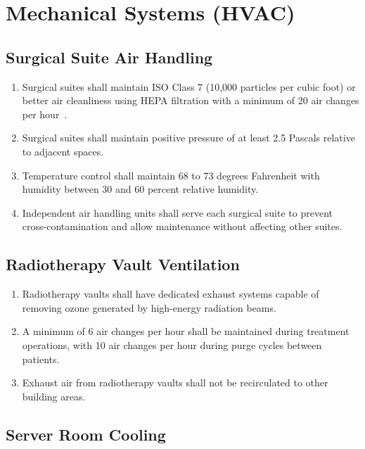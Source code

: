\documentclass[11pt,letterpaper]{article}
\begin{document}
\section{Mechanical Systems (HVAC)}

\subsection{Surgical Suite Air Handling}

\begin{enumerate}[label=(\alph*)]
\item Surgical suites shall maintain ISO Class 7 (10,000 particles per cubic
  foot) or better air cleanliness using HEPA filtration with a minimum of 20
  air changes per hour~\cite{sitespec2026}.

\item Surgical suites shall maintain positive pressure of at least 2.5 Pascals
  relative to adjacent spaces.

\item Temperature control shall maintain 68 to 73 degrees Fahrenheit with
  humidity between 30 and 60 percent relative humidity.

\item Independent air handling units shall serve each surgical suite to prevent
  cross-contamination and allow maintenance without affecting other suites.
\end{enumerate}

\subsection{Radiotherapy Vault Ventilation}

\begin{enumerate}[label=(\alph*)]
\item Radiotherapy vaults shall have dedicated exhaust systems capable of
  removing ozone generated by high-energy radiation beams.

\item A minimum of 6 air changes per hour shall be maintained during treatment
  operations, with 10 air changes per hour during purge cycles between patients.

\item Exhaust air from radiotherapy vaults shall not be recirculated to other
  building areas.
\end{enumerate}

\subsection{Server Room Cooling}
\end{document}
